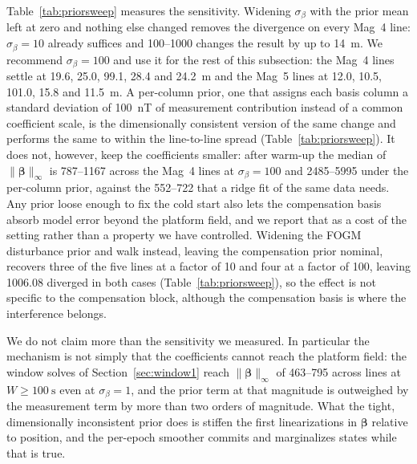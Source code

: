\documentclass{IEEEtaes}
\begin{document}
Table~\ref{tab:priorsweep} measures the sensitivity. Widening $\sigma_{\beta}$
with the prior mean left at zero and nothing else changed removes the divergence
on every Mag~4 line: $\sigma_{\beta}=10$ already suffices and
\numrange{100}{1000} changes the result by up to \SI{14}{\meter}. We recommend
$\sigma_{\beta}=100$ and use it for the rest of this subsection: the Mag~4 lines
settle at \num{19.6}, \num{25.0}, \num{99.1}, \num{28.4} and
\SI{24.2}{\meter} and the Mag~5 lines at \num{12.0}, \num{10.5}, \num{101.0},
\num{15.8} and \SI{11.5}{\meter}. A per-column prior, one that assigns each basis
column a standard deviation of \SI{100}{\nano\tesla} of measurement contribution
instead of a common coefficient scale, is the dimensionally consistent version of
the same change and performs the same to within the line-to-line spread
(Table~\ref{tab:priorsweep}). It does not, however, keep the coefficients
smaller: after warm-up the median of $\|\boldsymbol{\beta}\|_\infty$ is
\numrange{787}{1167} across the Mag~4 lines at $\sigma_{\beta}=100$ and
\numrange{2485}{5995} under the per-column prior, against the
\numrange{552}{722} that a ridge fit of the same data needs. Any prior loose
enough to fix the cold start also lets the compensation basis absorb model error
beyond the platform field, and we report that as a cost of the setting rather
than a property we have controlled. Widening the FOGM disturbance prior and
walk instead, leaving the compensation prior nominal, recovers three of the five
lines at a factor of \num{10} and four at a factor of \num{100}, leaving 1006.08
diverged in both cases (Table~\ref{tab:priorsweep}), so the effect is not specific to the compensation
block, although the compensation basis is where the interference belongs.

We do not claim more than the sensitivity we measured. In particular the
mechanism is not simply that the coefficients cannot reach the platform field:
the window solves of Section~\ref{sec:window1} reach $\|\boldsymbol{\beta}\|_\infty$
of \numrange{463}{795} across lines at $W\ge\SI{100}{\second}$ even at
$\sigma_{\beta}=1$, and the prior term at that
magnitude is outweighed by the measurement term by more than two orders of
magnitude. What the tight, dimensionally inconsistent prior does is stiffen the
first linearizations in $\boldsymbol{\beta}$ relative to position, and the
per-epoch smoother commits and marginalizes states while that is true.
\end{document}
